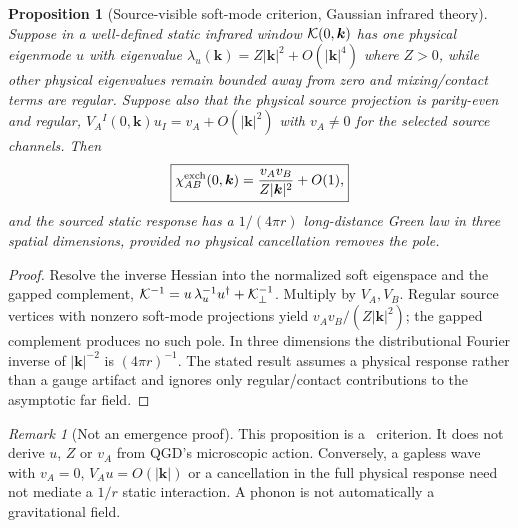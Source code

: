 \documentclass[11pt,a4paper]{article}
\newtheorem{proposition}[theorem]{Proposition}
\theoremstyle{remark}\newtheorem{remark}[theorem]{Remark}
\begin{document}
\begin{proposition}[Source-visible soft-mode criterion, Gaussian infrared theory]\label{prop:soft}
Suppose in a well-defined static infrared window $\mathcal K(0,\bm k)$ has one physical eigenmode $u$ with eigenvalue $\lambda_u(\bm k)=Z|\bm k|^2+O(|\bm k|^4)$ where $Z>0$, while other physical eigenvalues remain bounded away from zero and mixing/contact terms are regular. Suppose also that the physical source projection is parity-even and regular, $V_A{}^I(0,\bm k)u_I=v_A+O(|\bm k|^2)$ with $v_A\ne0$ for the selected source channels. Then
\begin{equation}\label{eq:soft-result}
\boxed{\chi_{AB}^{\rm exch}(0,\bm k)=\frac{v_Av_B}{Z|\bm k|^2}+O(1),}
\end{equation}
and the sourced static response has a $1/(4\pi r)$ long-distance Green law in three spatial dimensions, provided no physical cancellation removes the pole.
\end{proposition}
\begin{proof}
Resolve the inverse Hessian into the normalized soft eigenspace and the gapped complement, $\mathcal K^{-1}=u\,\lambda_u^{-1}u^\dagger+\mathcal K_\perp^{-1}$. Multiply by $V_A,V_B$. Regular source vertices with nonzero soft-mode projections yield $v_Av_B/(Z|\bm k|^2)$; the gapped complement produces no such pole. In three dimensions the distributional Fourier inverse of $|\bm k|^{-2}$ is $(4\pi r)^{-1}$. The stated result assumes a physical response rather than a gauge artifact and ignores only regular/contact contributions to the asymptotic far field.
\end{proof}
\begin{remark}[Not an emergence proof]
This proposition is a \C\ criterion. It does not derive $u$, $Z$ or $v_A$ from QGD's microscopic action. Conversely, a gapless wave with $v_A=0$, $V_Au=O(|\bm k|)$ or a cancellation in the full physical response need not mediate a $1/r$ static interaction. A phonon is not automatically a gravitational field.
\end{remark}
\end{document}
